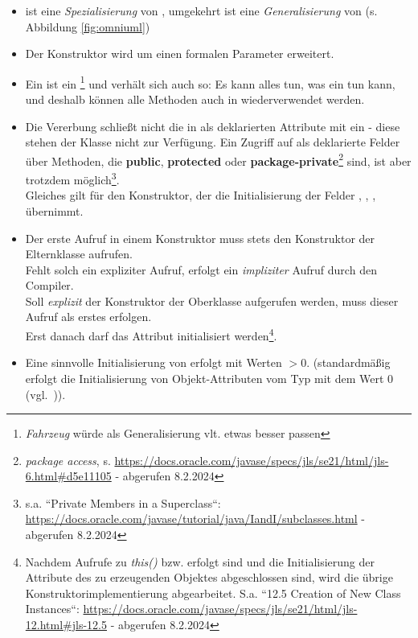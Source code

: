 \begin{itemize}
    \item {} ist eine \textit{Spezialisierung} von , umgekehrt ist
     eine \textit{Generalisierung} von  (s. Abbildung \ref{fig:omniuml})
    \item Der Konstruktor wird um einen formalen Parameter  erweitert.
    \item Ein  ist ein \footnote{\textit{Fahrzeug} würde als Generalisierung vlt. etwas besser passen} und verhält sich auch so: Es kann alles tun, was ein  tun kann, und deshalb können alle Methoden auch in  wiederverwendet werden.
    \item Die Vererbung schließt nicht die in  als  deklarierten Attribute mit ein - diese stehen der Klasse  nicht zur Verfügung.
    Ein Zugriff auf als  deklarierte Felder über Methoden, die \textbf{public}, \textbf{protected} oder \textbf{package-private}\footnote{\textit{package access}, s. \url{https://docs.oracle.com/javase/specs/jls/se21/html/jls-6.html#d5e11105} - abgerufen 8.2.2024} sind, ist aber trotzdem möglich\footnote{s.a. ``Private Members in a Superclass``: \url{https://docs.oracle.com/javase/tutorial/java/IandI/subclasses.html} - abgerufen 8.2.2024}.\\
    Gleiches gilt für den Konstruktor, der die Initialisierung der Felder , , ,  übernimmt.
    \item Der erste Aufruf in einem Konstruktor muss stets den Konstruktor der Elternklasse aufrufen.\\
    Fehlt solch ein expliziter Aufruf, erfolgt ein \textit{impliziter} Aufruf durch den Compiler.\\
    Soll \textit{explizit} der Konstruktor der Oberklasse aufgerufen werden, muss dieser Aufruf als erstes erfolgen.\\
    Erst danach darf das Attribut  initialisiert werden\footnote{
    Nachdem Aufrufe zu \textit{this()} bzw.  erfolgt sind und die Initialisierung der Attribute des zu erzeugenden Objektes abgeschlossen sind, wird die übrige Konstruktorimplementierung abgearbeitet. S.a. ``12.5 Creation of New Class Instances``: \url{https://docs.oracle.com/javase/specs/jls/se21/html/jls-12.html#jls-12.5} - abgerufen 8.2.2024
    }.
    \item Eine sinnvolle Initialisierung von  erfolgt mit Werten $> 0$.
    (standardmäßig erfolgt die Initialisierung von Objekt-Attributen vom Typ  mit dem Wert $0$ (vgl.~\cite[127]{Ull23})).
\end{itemize}


